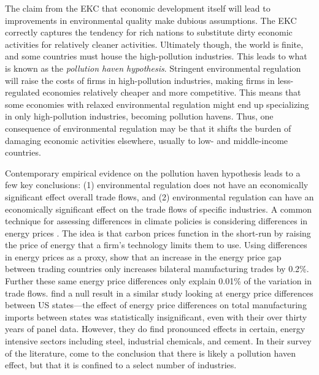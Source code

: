 The claim from the EKC that economic development itself will lead to improvements in environmental quality make dubious assumptions. The EKC correctly captures the tendency for rich nations to substitute dirty economic activities for relatively cleaner activities. Ultimately though, the world is finite, and some countries must house the high-pollution industries. This leads to what is known as the \emph{pollution haven hypothesis}. Stringent environmental regulation will raise the costs of firms in high-pollution industries, making firms in less-regulated economies relatively cheaper and more competitive. This means that some economies with relaxed environmental regulation might end up specializing in only high-pollution industries, becoming pollution havens. Thus, one consequence of environmental regulation may be that it shifts the burden of damaging economic activities elsewhere, usually to low- and middle-income countries. 

Contemporary empirical evidence on the pollution haven hypothesis leads to a few key conclusions: (1) environmental regulation does not have an economically significant effect overall trade flows, and (2) environmental regulation can have an economically significant effect on the trade flows of specific industries. A common technique for assessing differences in climate policies is considering differences in energy prices \citep[see for example][]{fowlie2022mitigating}. The idea is that carbon prices function in the short-run by raising the price of energy that a firm's technology limits them to use. Using differences in energy prices as a proxy, \cite{sato2015asymmetric} show that an increase in the energy price gap between trading countries only increases bilateral manufacturing trades by 0.2\%. Further these same energy price differences only explain 0.01\% of the variation in trade flows. \cite{aldy2015competitiveness} find a null result in a similar study looking at energy price differences between US states---the effect of energy price differences on total manufacturing imports between states was statistically insignificant, even with their over thirty years of panel data. However, they do find pronounced effects in certain, energy intensive sectors including steel, industrial chemicals, and cement. In their survey of the literature, \cite{dechezlepretre2020impacts} come to the conclusion that there is likely a pollution haven effect, but that it is confined to a select number of industries.


